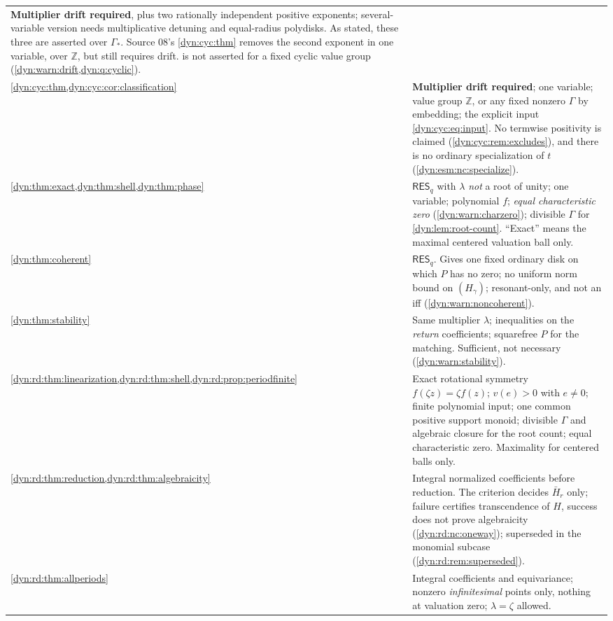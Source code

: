 \documentclass[11pt,letterpaper]{article}
\theoremstyle{definition}
\theoremstyle{remark}
\newcommand{\Z}{\mathbb Z}
\newcommand{\resq}{\mathsf{RES}_q}
\numberwithin{equation}{section}
\begin{document}
\begin{longtable}{@{}P{0.26\textwidth}P{0.67\textwidth}@{}}
\textbf{Multiplier drift required}, plus two rationally independent
positive exponents; several-variable version needs multiplicative detuning
and equal-radius polydisks. As stated, these three are asserted over
$\Gamma_{*}$. Source 08's \cref{dyn:cyc:thm} removes the second exponent in
one variable, over $\Z$, but still requires drift.
 is not asserted for a fixed cyclic value group
(\cref{dyn:warn:drift,dyn:q:cyclic}).\\[3pt]
\cref{dyn:cyc:thm,dyn:cyc:cor:classification} &
\textbf{Multiplier drift required}; one variable; value group $\Z$, or any
fixed nonzero $\Gamma$ by embedding; the explicit input
\eqref{dyn:cyc:eq:input}. No termwise positivity is claimed
(\cref{dyn:cyc:rem:excludes}), and there is no ordinary specialization of
$t$ (\ref{dyn:esm:nc:specialize}).\\[3pt]
\cref{dyn:thm:exact,dyn:thm:shell,dyn:thm:phase} &
$\resq$ with $\lambda$ \emph{not} a root of unity; one variable;
polynomial $f$; \emph{equal characteristic zero}
(\cref{dyn:warn:charzero}); divisible $\Gamma$ for
\cref{dyn:lem:root-count}. ``Exact'' means the maximal centered valuation
ball only.\\[3pt]
\cref{dyn:thm:coherent} &
$\resq$. Gives one fixed ordinary disk on which $P$ has no zero; no uniform
norm bound on $(H_\gamma)$; resonant-only, and not an iff
(\cref{dyn:warn:noncoherent}).\\[3pt]
\cref{dyn:thm:stability} &
Same multiplier $\lambda$; inequalities on the \emph{return} coefficients;
squarefree $P$ for the matching. Sufficient, not necessary
(\cref{dyn:warn:stability}).\\[3pt]
\cref{dyn:rd:thm:linearization,dyn:rd:thm:shell,dyn:rd:prop:periodfinite} &
Exact rotational symmetry $f(\zeta z)=\zeta f(z)$; $v(e)>0$ with $e\ne0$;
finite polynomial input; one common positive support monoid; divisible
$\Gamma$ and algebraic closure for the root count; equal characteristic
zero. Maximality for centered balls only.\\[3pt]
\cref{dyn:rd:thm:reduction,dyn:rd:thm:algebraicity} &
Integral normalized coefficients before reduction. The criterion decides
$\bar H_r$ only; failure certifies transcendence of $H$, success does not
prove algebraicity (\ref{dyn:rd:nc:oneway}); superseded in the monomial
subcase (\cref{dyn:rd:rem:superseded}).\\[3pt]
\cref{dyn:rd:thm:allperiods} &
Integral coefficients and equivariance; nonzero \emph{infinitesimal} points
only, nothing at valuation zero; $\lambda=\zeta$ allowed.\\[3pt]

\end{longtable}
\end{document}
